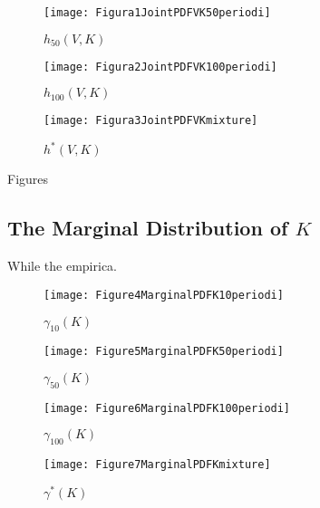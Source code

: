 \documentclass[12pt]{article}
\begin{document}
\begin{minipage}[t]{0.33\textwidth}
	\begin{figure}[H]
	\center
	\texttt{[image: Figura1JointPDFVK50periodi]}
	\caption{$h_{50}(V,K)$}
	\label{fig:fig1}
\end{figure}
\end{minipage}%
\begin{minipage}[t]{0.33\textwidth}
		\begin{figure}[H]
		\center
	\texttt{[image: Figura2JointPDFVK100periodi]}
	\caption{$h_{100}(V,K)$}
	\label{fig:fig2}
\end{figure}
\end{minipage}%
\begin{minipage}[t]{0.33\textwidth}
		\begin{figure}[H]
		\center
	\texttt{[image: Figura3JointPDFVKmixture]}
	\caption{$h^*(V,K)$}
	\label{fig:fig3}
\end{figure}
\end{minipage}

\bigskip

\noindent Figures 

\subsection{The Marginal Distribution of $K$}

While the empirica.

\noindent 
\begin{minipage}[t]{0.5\textwidth} %
	\begin{figure}[H]
		\center
		\texttt{[image: Figure4MarginalPDFK10periodi]}
		\caption{$\gamma _{10}(K)$}
		\label{fig:fig4}
	\end{figure}
\end{minipage}
\begin{minipage}[t]{0.5\textwidth} %
	\begin{figure}[H]
		\center
		\texttt{[image: Figure5MarginalPDFK50periodi]}
		\caption{$\gamma _{50}(K)$}
		\label{fig:fig5}
	\end{figure}
\end{minipage}\newline
\begin{minipage}[t]{0.5\textwidth} %
	\begin{figure}[H]
		\center
		\texttt{[image: Figure6MarginalPDFK100periodi]}
		\caption{$\gamma _{100}(K)$}
		\label{fig:fig6}
	\end{figure}
\end{minipage}
\begin{minipage}[t]{0.5\textwidth} %
	\begin{figure}[H]
		\center
		\texttt{[image: Figure7MarginalPDFKmixture]}
		\caption{$\gamma^*(K)$}
		\label{fig:fig7}
		\end{figure}
	\end{minipage}
\end{document}
